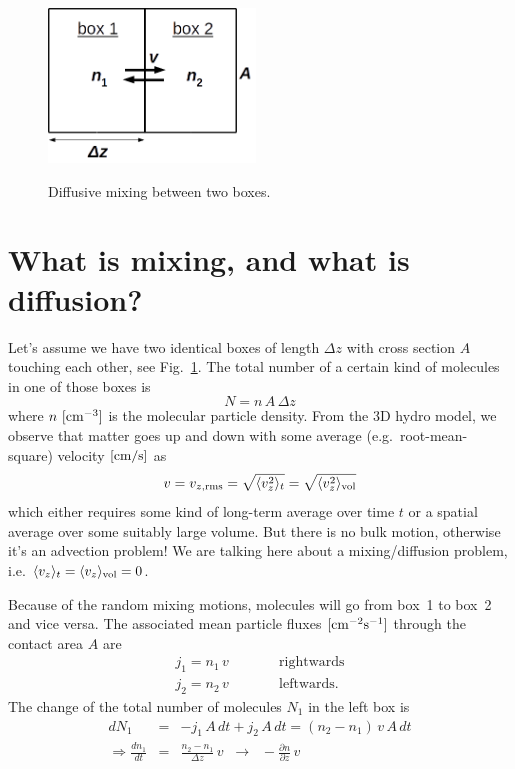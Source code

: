 \documentclass[11pt]{article}
\begin{document}
\begin{figure}
\centering
\includegraphics[width=5.5cm]{box2.png}\\[-5mm]
\caption{Diffusive mixing between two boxes.}
\label{2boxes}
\end{figure}

\section{What is mixing, and what is diffusion?}

Let's assume we have two identical boxes of length $\Delta z$ with cross
section $A$ touching each other, see Fig.~\ref{2boxes}. The total 
number of a certain kind of molecules in one of those boxes is
\begin{equation}
  N = n\,A\,\Delta z
\end{equation} 
where $n\rm\ [cm^{-3}]$ is the molecular particle density. From the 3D hydro
model, we observe that matter goes up and down with some
average (e.g.\ root-mean-square) velocity $\rm[cm/s]$ as
\begin{equation}
  v = v_{z,\rm rms} = \sqrt{\langle v_z^2 \rangle_t} 
                   = \sqrt{\langle v_z^2 \rangle_{\rm vol}}
\end{equation}
which either requires some kind of long-term average over time $t$ or
a spatial average over some suitably large volume. But there is no
bulk motion, otherwise it's an advection problem! We are talking here
about a mixing/diffusion problem, i.e. $\langle v_z \rangle_t =
\langle v_z \rangle_{\rm vol} = 0$.

Because of the random mixing motions, molecules will go from box~1 to
box~2 and vice versa. The associated mean particle fluxes $\rm[cm^{-2}s^{-1}]$ 
through the contact area $A$ are
\begin{eqnarray}
  j_1 = n_1\,v &\quad\quad& \mbox{rightwards}\\ 
  j_2 = n_2\,v &\quad\quad& \mbox{leftwards.}
\end{eqnarray}
The change of the total number of molecules $N_1$ in the left box is
\begin{eqnarray}
  dN_1 &=& -j_1\,A\,dt + j_2\,A\,dt = (n_2-n_1)\,v\,A\,dt \\
\Rightarrow
  \frac{dn_1}{dt} &=& \frac{n_2-n_1}{\Delta z}\,v
                 \;\;\to\;\; -\frac{\partial n}{\partial z}\,v
\end{eqnarray}
\end{document}
